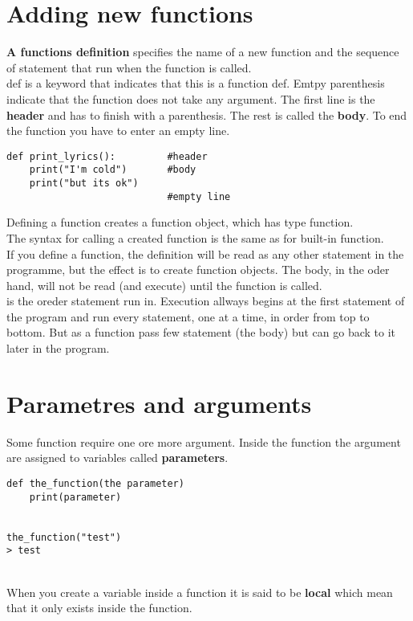 \documentclass{report}
\begin{document}
\section{Adding new functions}
\textbf{A functions definition} specifies the name of a new function
and the sequence of statement that run when the function is called.\\

def is a keyword that indicates that this is a function def. Emtpy 
parenthesis indicate that the function does not take any argument. The 
first line is the \textbf{header} and has to finish with a parenthesis. The 
rest is called the \textbf{body}. To end the function you have to enter an empty line.

\begin{verbatim}
def print_lyrics():         #header
    print("I'm cold")       #body
    print("but its ok")
                            #empty line
\end{verbatim}
Defining a function creates a function object, which has type function.\\
The syntax for calling a created function is the same as for built-in function.\\

If you define a function, the definition will be read as any other statement 
in the programme, but the effect is to create function objects. The body, in the 
oder hand, will not be read (and execute) until the function is called.\\
 is the oreder statement run in.
Execution allways begins at the first statement of the program and run every 
statement, one at a time, in order from top to bottom. But as a function
pass few statement (the body) but can go back to it later in the program.

\section{Parametres and arguments}
Some function require one ore more argument. Inside the function
the argument are assigned to variables called \textbf{parameters}.

\begin{verbatim}
def the_function(the parameter)
    print(parameter)


the_function("test")
> test
\end{verbatim}\\

When you create a variable inside a function it is said to be \textbf{local}
which mean that it only exists inside the function.
\end{document}
